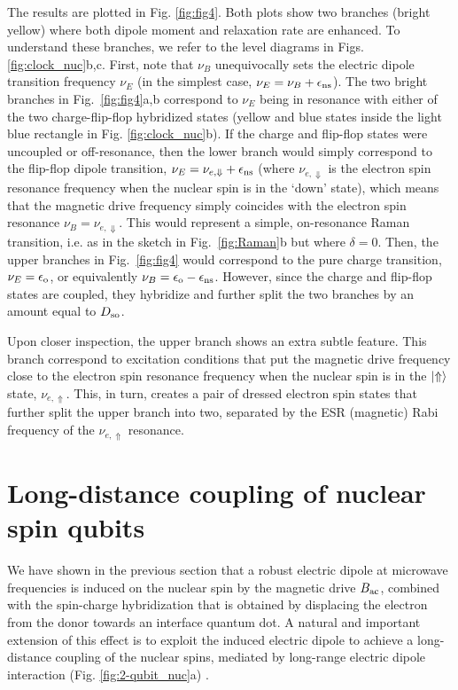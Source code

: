 \documentclass[
 aps,prb,twocolumn,
 amsmath,amssymb,superscriptaddress,
] {revtex4-1}
\begin{document}
The results are plotted in Fig. \ref{fig:fig4}. Both plots show two branches (bright yellow) where both dipole moment and relaxation rate are enhanced. To understand these branches, we refer to the level diagrams in Figs. \ref{fig:clock_nuc}b,c. First, note that $\nu_B$ unequivocally sets the electric dipole transition frequency $\nu_E$ (in the simplest case, $\nu_E=\nu_B+\epsilon_{\rm ns}$). The two bright branches in  Fig.~\ref{fig:fig4}a,b correspond to $\nu_E$ being in resonance with either of the two charge-flip-flop hybridized states (yellow and blue states inside the light blue rectangle in Fig. \ref{fig:clock_nuc}b). If the charge and flip-flop states were uncoupled or off-resonance, then the lower branch would simply correspond to the flip-flop dipole transition, $\nu_E=\nu_{e,\Downarrow}+\epsilon_{\rm ns}$ (where $\nu_{e,\Downarrow}$ is the electron spin resonance frequency when the nuclear spin is in the `down' state), which means that the magnetic drive frequency simply coincides with the electron spin resonance $\nu_B=\nu_{e,\Downarrow}$. This would represent a simple, on-resonance Raman transition, i.e. as in the sketch in Fig.~\ref{fig:Raman}b but where $\delta=0$. Then, the upper branches in Fig.~\ref{fig:fig4} would correspond to the pure charge transition, $\nu_E=\epsilon_{\rm o}$, or equivalently $\nu_B=\epsilon_{\rm o}-\epsilon_{\rm ns}$. However, since the charge and flip-flop states are coupled, they hybridize and further split the two branches by an amount equal to $D_{\rm so}$.

Upon closer inspection, the upper branch shows an extra subtle feature. This branch correspond to excitation conditions that put the magnetic drive frequency close to the electron spin resonance frequency when the nuclear spin is in the $\ket{\Uparrow}$ state, $\nu_{e,\Uparrow}$. This, in turn, creates a pair of dressed electron spin states that further split the upper branch into two, separated by the ESR (magnetic) Rabi frequency of the $\nu_{e,\Uparrow}$ resonance. %

\section{Long-distance coupling of nuclear spin qubits} \label{sec:long}

We have shown in the previous section that a robust electric dipole at microwave frequencies is induced on the nuclear spin by the magnetic drive $B_{\rm ac}$, combined with the spin-charge hybridization that is obtained by displacing the electron from the donor towards an interface quantum dot. A natural and important extension of this effect is to exploit the induced electric dipole to achieve a long-distance coupling of the nuclear spins, mediated by long-range electric dipole interaction (Fig. \ref{fig:2-qubit_nuc}a) \cite{Tosi2017}. 
\end{document}
